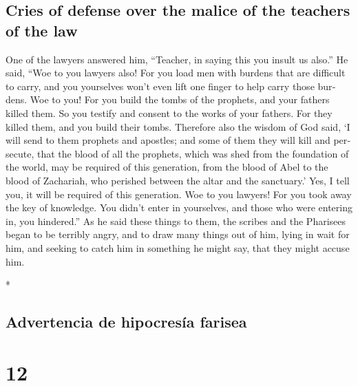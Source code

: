 \begin{paracol}{2}
\begin{otherlanguage}{english}
\hypertarget{cries-of-defense-over-the-malice-of-the-teachers-of-the-law}{%
\subsection{Cries of defense over the malice of the teachers of the
law}\label{cries-of-defense-over-the-malice-of-the-teachers-of-the-law}}

 One of the lawyers answered him, ``Teacher, in saying
this you insult us also.''  He said, ``Woe to you lawyers
also! For you load men with burdens that are difficult to carry, and you
yourselves won't even lift one finger to help carry those burdens.
 Woe to you! For you build the tombs of the prophets, and
your fathers killed them.  So you testify and consent to
the works of your fathers. For they killed them, and you build their
tombs.  Therefore also the wisdom of God said, `I will
send to them prophets and apostles; and some of them they will kill and
persecute,  that the blood of all the prophets, which was
shed from the foundation of the world, may be required of this
generation,  from the blood of Abel to the blood of
Zachariah, who perished between the altar and the sanctuary.' Yes, I
tell you, it will be required of this generation.  Woe to
you lawyers! For you took away the key of knowledge. You didn't enter in
yourselves, and those who were entering in, you hindered.''
 As he said these things to them, the scribes and the
Pharisees began to be terribly angry, and to draw many things out of
him,  lying in wait for him, and seeking to catch him in
something he might say, that they might accuse him.

\end{otherlanguage}

\switchcolumn[0]*

\hypertarget{advertencia-de-hipocresuxeda-farisea}{%
\subsection{Advertencia de hipocresía
farisea}\label{advertencia-de-hipocresuxeda-farisea}}

\hypertarget{section-22}{%
\section{12}\label{section-22}}


\end{paracol}
